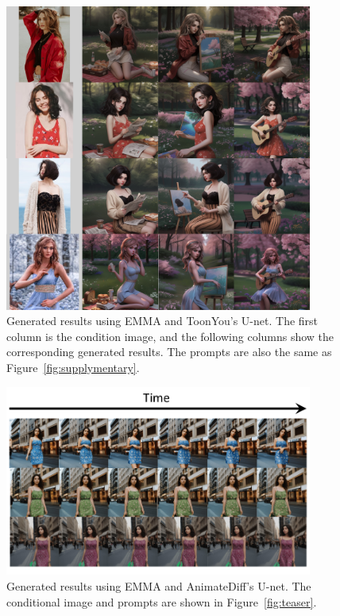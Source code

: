 \begin{figure}[t]
    \centering
    \includegraphics[width=0.9\textwidth]{images/supplymentary_toonyou.pdf}
    \caption{Generated results using EMMA and ToonYou's U-net. The first column is the condition image, and the following columns show the corresponding generated results. The prompts are also the same as Figure~\ref{fig:supplymentary}.}
    \label{fig:supplymentary_toonyou}
\end{figure}
\begin{figure}[t]
    \centering
    \includegraphics[width=0.9\textwidth]{images/supplymentary_video.pdf}
    \caption{Generated results using EMMA and AnimateDiff's U-net. The conditional image and prompts are shown in Figure~\ref{fig:teaser}. }
    \label{fig:supplymentary_video}
\end{figure}

